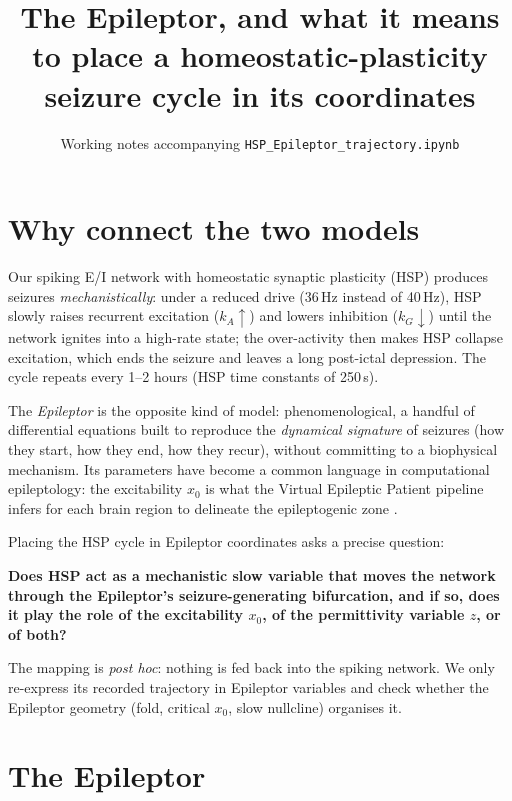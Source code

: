 \documentclass[11pt]{article}
\title{The Epileptor, and what it means to place a homeostatic-plasticity\\ seizure cycle in its coordinates}
\author{}
\date{Working notes accompanying \texttt{HSP\_Epileptor\_trajectory.ipynb}}
\newcommand{\kA}{k_A}
\newcommand{\kG}{k_G}
\newcommand{\keybox}[1]{\par\noindent\colorbox{boxc}{\parbox{\dimexpr\linewidth-2\fboxsep}{\small #1}}\par\medskip}
\begin{document}
\maketitle
\tableofcontents
\newpage

\section{Why connect the two models}
Our spiking E/I network with homeostatic synaptic plasticity (HSP) produces seizures \emph{mechanistically}: under
a reduced drive (36\,Hz instead of 40\,Hz), HSP slowly raises recurrent excitation ($\kA\uparrow$) and lowers
inhibition ($\kG\downarrow$) until the network ignites into a high-rate state; the over-activity then makes HSP
collapse excitation, which ends the seizure and leaves a long post-ictal depression. The cycle repeats every
1--2 hours (HSP time constants of 250\,s).

The \emph{Epileptor} \cite{jirsa2014} is the opposite kind of model: phenomenological, a handful of
differential equations built to reproduce the \emph{dynamical signature} of seizures (how they start, how they
end, how they recur), without committing to a biophysical mechanism. Its parameters have become a common language
in computational epileptology: the excitability $x_0$ is what the Virtual Epileptic Patient pipeline infers for each
brain region to delineate the epileptogenic zone \cite{jirsa2017,proix2017}.

Placing the HSP cycle in Epileptor coordinates asks a precise question:
\keybox{\textbf{Does HSP act as a mechanistic slow variable that moves the network through the Epileptor's
seizure-generating bifurcation, and if so, does it play the role of the excitability $x_0$, of the permittivity
variable $z$, or of both?}}
The mapping is \emph{post hoc}: nothing is fed back into the spiking network. We only re-express its recorded
trajectory in Epileptor variables and check whether the Epileptor geometry (fold, critical $x_0$, slow
nullcline) organises it.

\section{The Epileptor}
\end{document}
